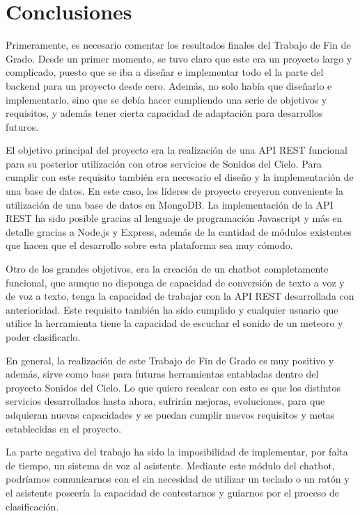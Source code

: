\chapter{Conclusiones}

Primeramente, es necesario comentar los resultados finales del Trabajo de Fin de Grado. Desde un primer momento, se tuvo claro que este era un proyecto largo y complicado, puesto que se iba a diseñar e implementar todo el la parte del backend para un proyecto desde cero. Además, no solo había que diseñarlo e implementarlo, sino que se debía hacer cumpliendo una serie de objetivos y requisitos, y además tener cierta capacidad de adaptación para desarrollos futuros.

El objetivo principal del proyecto era la realización de una API REST funcional para su posterior utilización con otros servicios de Sonidos del Cielo. Para cumplir con este requisito también era necesario el diseño y la implementación de una base de datos. En este caso, los líderes de proyecto creyeron conveniente la utilización de una base de datos en MongoDB. La implementación de la API REST ha sido posible gracias al lenguaje de programación Javascript y más en detalle gracias a Node.js y Express, además de la cantidad de módulos existentes que hacen que el desarrollo sobre esta plataforma sea muy cómodo.

Otro de los grandes objetivos, era la creación de un chatbot completamente funcional, que aunque no disponga de capacidad de conversión de texto a voz y de voz a texto, tenga la capacidad de trabajar con la API REST desarrollada con anterioridad. Este requisito también ha sido cumplido y cualquier usuario que utilice la herramienta tiene la capacidad de escuchar el sonido de un meteoro y poder clasificarlo. 

En general, la realización de este Trabajo de Fin de Grado  es muy positivo y además, sirve como base para futuras herramientas entabladas dentro del proyecto Sonidos del Cielo. Lo que quiero recalcar con esto es que los distintos servicios desarrollados hasta ahora, sufrirán mejoras, evoluciones, para que adquieran nuevas capacidades y se puedan cumplir nuevos requisitos y metas establecidas en el proyecto.

La parte negativa del trabajo ha sido la imposibilidad de implementar, por falta de tiempo, un sistema de voz al asistente. Mediante este módulo del chatbot, podríamos comunicarnos con el sin necesidad de utilizar un teclado o un ratón y el asistente poseería la capacidad de contestarnos y guiarnos por el proceso de clasificación.

